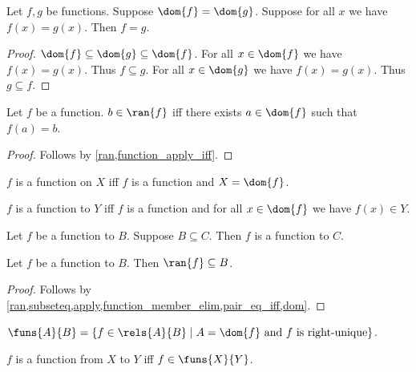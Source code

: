 \begin{proposition}\label{funext}
    Let $f, g$ be functions.
    Suppose $\dom{f} = \dom{g}$.
    Suppose for all $x$ we have  $f(x) = g(x)$.
    Then $f = g$.
\end{proposition}
\begin{proof}
    $\dom{f}\subseteq \dom{g}\subseteq \dom{f}$.
    For all $x\in\dom{f}$ we have $f(x) = g(x)$.
    Thus $f\subseteq g$.
    For all $x\in\dom{g}$ we have $f(x) = g(x)$.
    Thus $g\subseteq f$.
\end{proof}

\begin{proposition}\label{fun_ran_iff}
    Let $f$ be a function.
    $b\in\ran{f}$ iff there exists $a\in\dom{f}$ such that $f(a) = b$.
\end{proposition}
\begin{proof}
    Follows by \cref{ran,function_apply_iff}.
\end{proof}

\begin{abbreviation}\label{function_on}
    $f$ is a function on $X$ iff $f$ is a function and $X = \dom{f}$.
\end{abbreviation}

\begin{abbreviation}\label{function_to}
    $f$ is a function to $Y$ iff $f$ is a function and for all $x\in\dom{f}$ we have $f(x)\in Y$.
\end{abbreviation}

\begin{proposition}\label{function_on_weaken_codom}
    Let $f$ be a function to $B$.
    Suppose $B\subseteq C$.
    Then $f$ is a function to $C$.
\end{proposition}

\begin{proposition}\label{function_to_ran}
    Let $f$ be a function to $B$.
    Then $\ran{f}\subseteq B$.
\end{proposition}
\begin{proof}
    Follows by \cref{ran,subseteq,apply,function_member_elim,pair_eq_iff,dom}.
\end{proof}

\begin{definition}\label{funs}
    $\funs{A}{B} = \{ f\in\rels{A}{B}\mid \text{$A= \dom{f}$ and $f$ is right-unique}\}$.
\end{definition}

\begin{abbreviation}\label{function_from_to}
    $f$ is a function from $X$ to $Y$ iff $f\in\funs{X}{Y}$.
\end{abbreviation}

